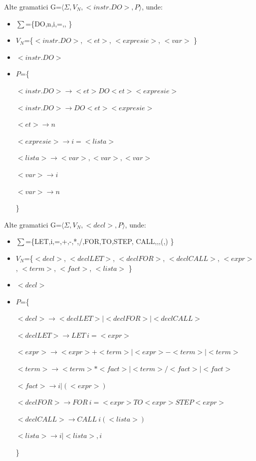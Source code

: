 \documentclass[pdf]{beamer}
\begin{document}
\begin{frame}{Alte gramatici}
G=$\langle \Sigma, V_N, <instr. DO>, P \rangle$, unde:

\begin{itemize}
\item
$\sum$=\{DO,n,i,=,, \}
\item
$V_N$=\{$<instr. DO>$, $<et>$, $<expresie>$, $<var>$ \}
\item
$<instr. DO>$
\item
$P$=\{

$<instr. DO> \rightarrow <et> DO <et><expresie>$

$<instr. DO> \rightarrow DO <et> <expresie>$

$<et> \rightarrow n$

$<expresie> \rightarrow i = <lista>$

$<lista> \rightarrow <var>,<var>,<var>$

$<var> \rightarrow i$

$<var> \rightarrow n$

\}
\end{itemize}

\end{frame}



\begin{frame}{Alte gramatici}
G=$\langle \Sigma, V_N, <decl>, P \rangle$, unde:

\begin{itemize}
\item
$\sum$=\{LET,i,=,+,-,*,/,FOR,TO,STEP, CALL,,,(,) \}
\item
$V_N$=\{$<decl>$, $<decl LET>$, $<decl FOR>$, $<decl CALL>$, $<expr>$, $<term>$, $<fact>$, $<lista>$ \}
\item
$<decl>$
\item
$P$=\{

$<decl> \rightarrow <decl LET> | <decl FOR> | <decl CALL>$

$<decl LET> \rightarrow LET \ i=<expr>$

$<expr> \rightarrow <expr>+<term> | <expr>-<term> | <term>$

$<term> \rightarrow <term>*<fact> | <term>/<fact> | <fact>$

$<fact> \rightarrow i | (<expr>)$

$<decl FOR> \rightarrow FOR \ i=<expr> TO <expr> STEP <expr>$

$<decl CALL> \rightarrow CALL \ i(<lista>)$

$<lista> \rightarrow i | <lista>, i$

\}
\end{itemize}

\end{frame}
\end{document}
